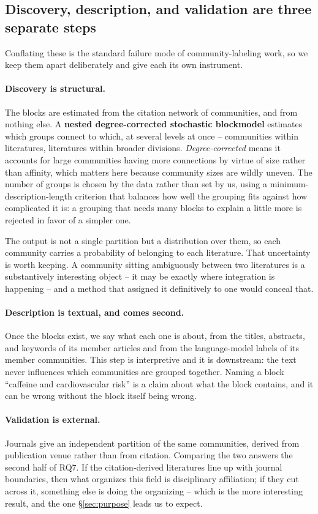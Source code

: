 \documentclass[11pt]{article}
\begin{document}
\subsection{Discovery, description, and validation are three separate steps}

Conflating these is the standard failure mode of community-labeling work, so we keep them
apart deliberately and give each its own instrument.

\paragraph{Discovery is structural.} The blocks are estimated from the citation network of
communities, and from nothing else. A \textbf{nested degree-corrected stochastic blockmodel}
estimates which groups connect to which, at several levels at once -- communities within
literatures, literatures within broader divisions. \emph{Degree-corrected} means it accounts
for large communities having more connections by virtue of size rather than affinity, which
matters here because community sizes are wildly uneven. The number of groups is chosen by the
data rather than set by us, using a minimum-description-length criterion that balances how
well the grouping fits against how complicated it is: a grouping that needs many blocks to
explain a little more is rejected in favor of a simpler one.

The output is not a single partition but a distribution over them, so each community carries a
probability of belonging to each literature. That uncertainty is worth keeping. A community
sitting ambiguously between two literatures is a substantively interesting object -- it may be
exactly where integration is happening -- and a method that assigned it definitively to one
would conceal that.

\paragraph{Description is textual, and comes second.} Once the blocks exist, we say what each
one is about, from the titles, abstracts, and keywords of its member articles and from the
language-model labels of its member communities. This step is interpretive and it is
downstream: the text never influences which communities are grouped together. Naming a block
``caffeine and cardiovascular risk'' is a claim about what the block contains, and it can be
wrong without the block itself being wrong.

\paragraph{Validation is external.} Journals give an independent partition of the same
communities, derived from publication venue rather than from citation. Comparing the two
answers the second half of RQ7. If the citation-derived literatures line up with journal
boundaries, then what organizes this field is disciplinary affiliation; if they cut across it,
something else is doing the organizing -- which is the more interesting result, and the one
\S\ref{sec:purpose} leads us to expect.
\end{document}

